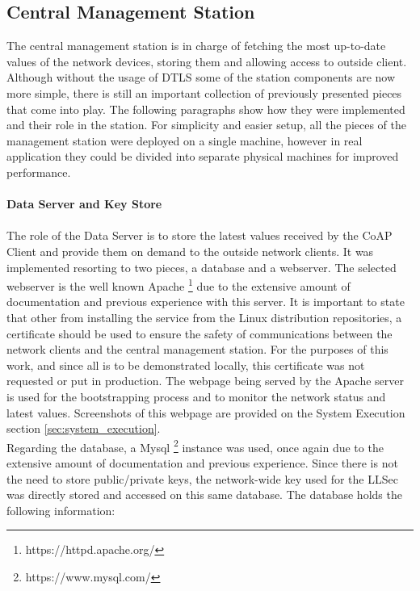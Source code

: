 \subsection{Central Management Station}
\label{backend_services}

The central management station is in charge of fetching the most up-to-date values of the network devices, storing them and allowing access to outside client. Although without the usage of \gls{DTLS} some of the station components are now more simple, there is still an important collection of previously presented pieces that come into play. The following paragraphs show how they were implemented and their role in the station. For simplicity and easier setup, all the pieces of the management station were deployed on a single machine, however in real application they could be divided into separate physical machines for improved performance.

\paragraph{\textbf{Data Server and Key Store}}
\paragraph{}
The role of the Data Server is to store the latest values received by the \gls{CoAP} Client and provide them on demand to the outside network clients. It was implemented resorting to two pieces, a database and a webserver. The selected webserver is the well known Apache \footnote{https://httpd.apache.org/} due to the extensive amount of documentation and previous experience with this server. It is important to state that other from installing the service from the Linux distribution repositories, a certificate should be used to ensure the safety of communications between the network clients and the central management station. For the purposes of this work, and since all is to be demonstrated locally, this certificate was not requested or put in production. The webpage being served by the Apache server is used for the bootstrapping process and to monitor the network status and latest values. Screenshots of this webpage are provided on the System Execution section \ref{sec:system_execution}.\\
Regarding the database, a Mysql \footnote{https://www.mysql.com/} instance was used, once again due to the extensive amount of documentation and previous experience. Since there is not the need to store public/private keys, the network-wide key used for the \gls{LLSec} was directly stored and accessed on this same database. The database holds the following information:


